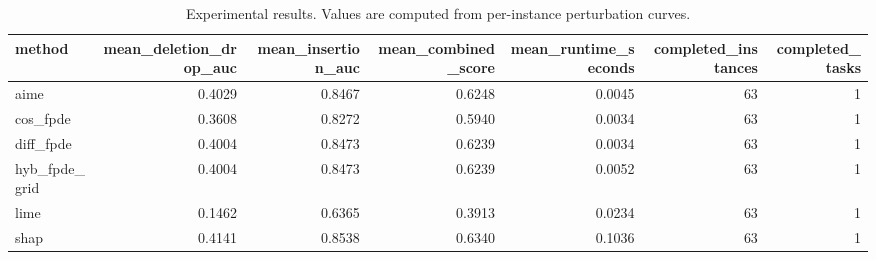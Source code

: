 \begin{table}[t]
\caption{Experimental results. Values are computed from per-instance perturbation curves.}
\label{tab:main_results_computed}
\centering
\begin{tabular}{lrrrrrr}
\toprule
method & mean\_deletion\_drop\_auc & mean\_insertion\_auc & mean\_combined\_score & mean\_runtime\_seconds & completed\_instances & completed\_tasks \\
\midrule
aime & 0.4029 & 0.8467 & 0.6248 & 0.0045 & 63 & 1 \\
cos\_fpde & 0.3608 & 0.8272 & 0.5940 & 0.0034 & 63 & 1 \\
diff\_fpde & 0.4004 & 0.8473 & 0.6239 & 0.0034 & 63 & 1 \\
hyb\_fpde\_grid & 0.4004 & 0.8473 & 0.6239 & 0.0052 & 63 & 1 \\
lime & 0.1462 & 0.6365 & 0.3913 & 0.0234 & 63 & 1 \\
shap & 0.4141 & 0.8538 & 0.6340 & 0.1036 & 63 & 1 \\
\bottomrule
\end{tabular}

\end{table}
